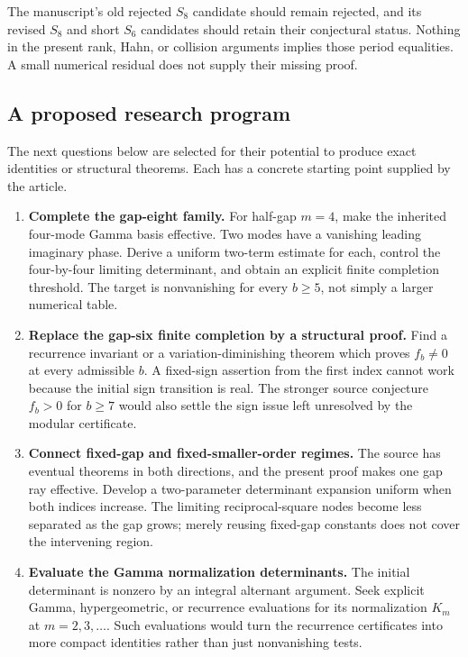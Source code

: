The manuscript's old rejected $S_8$ candidate should remain
rejected, and its revised $S_8$ and short $S_6$ candidates should
retain their conjectural status. Nothing in the present rank,
Hahn, or collision arguments implies those period equalities.
A small numerical residual does not supply their missing proof.

\subsection{A proposed research program}

The next questions below are selected for their potential to
produce exact identities or structural theorems. Each has a
concrete starting point supplied by the article.

\begin{enumerate}[label=\textbf{Q\arabic*.},leftmargin=*]
\item \textbf{Complete the gap-eight family.}
For half-gap $m=4$, make the inherited four-mode Gamma basis
effective. Two modes have a vanishing leading imaginary phase.
Derive a uniform two-term estimate for each, control the
four-by-four limiting determinant, and obtain an explicit finite
completion threshold. The target is nonvanishing for every
$b\ge5$, not simply a larger numerical table.

\item \textbf{Replace the gap-six finite completion by a structural proof.}
Find a recurrence invariant or a variation-diminishing theorem
which proves $f_b\ne0$ at every admissible $b$. A fixed-sign
assertion from the first index cannot work because the initial
sign transition is real. The stronger source conjecture
$f_b>0$ for $b\ge7$ would also settle the sign issue left
unresolved by the modular certificate.

\item \textbf{Connect fixed-gap and fixed-smaller-order regimes.}
The source has eventual theorems in both directions, and the
present proof makes one gap ray effective. Develop a
two-parameter determinant expansion uniform when both indices
increase. The limiting reciprocal-square nodes become less
separated as the gap grows; merely reusing fixed-gap constants
does not cover the intervening region.

\item \textbf{Evaluate the Gamma normalization determinants.}
The initial determinant is nonzero by an integral alternant
argument. Seek explicit Gamma, hypergeometric, or recurrence
evaluations for its normalization $K_m$ at $m=2,3,\ldots$.
Such evaluations would turn the recurrence certificates into
more compact identities rather than just nonvanishing tests.


\end{enumerate}
